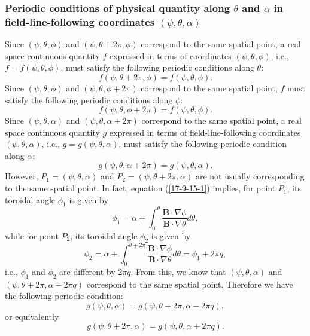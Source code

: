 \documentclass{article}
\begin{document}
\subsubsection{Periodic conditions of physical quantity along $\theta$ and
$\alpha$ in field-line-following coordinates $(\psi, \theta,
\alpha)$}\label{17-11-10-3}

Since $(\psi, \theta, \phi)$ and $(\psi, \theta + 2 \pi, \phi)$ correspond to
the same spatial point, a real space continuous quantity $f$ expressed in
terms of coordinates $(\psi, \theta, \phi)$, i.e., $f = f (\psi, \theta,
\phi)$, must satisfy the following periodic conditions along $\theta$:
\begin{equation}
  f (\psi, \theta + 2 \pi, \phi) = f (\psi, \theta, \phi) .
\end{equation}
Since $(\psi, \theta, \phi)$ and $(\psi, \theta, \phi + 2 \pi)$ correspond to
the same spatial point, $f$ must satisfy the following periodic conditions
along $\phi$:
\begin{equation}
  f (\psi, \theta, \phi + 2 \pi) = f (\psi, \theta, \phi) .
\end{equation}
Since $(\psi, \theta, \alpha)$ and $(\psi, \theta, \alpha + 2 \pi)$ correspond
to the same spatial point, a real space continuous quantity $g$ expressed in
terms of field-line-following coordinates $(\psi, \theta, \alpha)$, i.e., $g =
g (\psi, \theta, \alpha)$, must satisfy the following periodic condition along
$\alpha$:
\begin{equation}
  g (\psi, \theta, \alpha + 2 \pi) = g (\psi, \theta, \alpha) .
\end{equation}
However, $P_1 = (\psi, \theta, \alpha)$ and $P_2 = (\psi, \theta + 2 \pi,
\alpha)$ are not usually corresponding to the same spatial point. In fact,
equation (\ref{17-9-15-1}) implies, for point $P_1$, its toroidal angle
$\phi_1$ is given by
\begin{equation}
  \phi_1 = \alpha + \int_0^{\theta} \frac{\mathbf{B} \cdot \nabla
  \phi}{\mathbf{B} \cdot \nabla \theta} d \theta,
\end{equation}
while for point $P_2$, its toroidal angle $\phi_2$ is given by
\begin{equation}
  \phi_2 = \alpha + \int_0^{\theta + 2 \pi} \frac{\mathbf{B} \cdot \nabla
  \phi}{\mathbf{B} \cdot \nabla \theta} d \theta = \phi_1 + 2 \pi q,
\end{equation}
i.e., $\phi_1$ and $\phi_2$ are different by $2 \pi q$. From this, we know
that $(\psi, \theta, \alpha)$ and $(\psi, \theta + 2 \pi, \alpha - 2 \pi q)$
correspond to the same spatial point. Therefore we have the following periodic
condition:
\begin{equation}
  \label{17-11-2-p1} g (\psi, \theta, \alpha) = g (\psi, \theta + 2 \pi,
  \alpha - 2 \pi q),
\end{equation}
or equivalently
\begin{equation}
  g (\psi, \theta + 2 \pi, \alpha) = g (\psi, \theta, \alpha + 2 \pi q) .
\end{equation}
\end{document}
